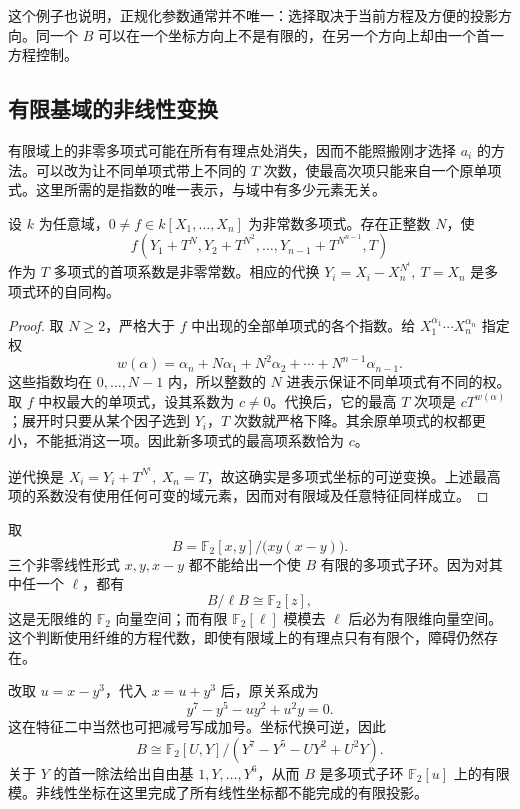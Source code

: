 这个例子也说明，正规化参数通常并不唯一：选择取决于当前方程及方便的投影方向。同一个 \(B\) 可以在一个坐标方向上不是有限的，在另一个方向上却由一个首一方程控制。

\subsection{有限基域的非线性变换}
\label{g5:subsec:0302:03}

有限域上的非零多项式可能在所有有理点处消失，因而不能照搬刚才选择 \(a_i\) 的方法。可以改为让不同单项式带上不同的 \(T\) 次数，使最高次项只能来自一个原单项式。这里所需的是指数的唯一表示，与域中有多少元素无关。

\begin{lemma}\label{g5:lem:weighted-monic-change}
	设 \(k\) 为任意域，\(0\ne f\in k[X_1,\ldots,X_n]\) 为非常数多项式。存在正整数 \(N\)，使
	\[
	f(Y_1+T^N,Y_2+T^{N^2},\ldots,Y_{n-1}+T^{N^{n-1}},T)
	\]
	作为 \(T\) 多项式的首项系数是非零常数。相应的代换
	\(Y_i=X_i-X_n^{N^i},\ T=X_n\)
	是多项式环的自同构。
\end{lemma}
\begin{proof}
	取 \(N\geq2\)，严格大于 \(f\) 中出现的全部单项式的各个指数。给
	\(X_1^{\alpha_1}\cdots X_n^{\alpha_n}\)
	指定权
	\[
	w(\alpha)=\alpha_n+N\alpha_1+N^2\alpha_2+\cdots+N^{n-1}\alpha_{n-1}.
	\]
	这些指数均在 \(0,\ldots,N-1\) 内，所以整数的 \(N\) 进表示保证不同单项式有不同的权。取 \(f\) 中权最大的单项式，设其系数为 \(c\ne0\)。代换后，它的最高 \(T\) 次项是 \(cT^{w(\alpha)}\)；展开时只要从某个因子选到 \(Y_i\)，\(T\) 次数就严格下降。其余原单项式的权都更小，不能抵消这一项。因此新多项式的最高项系数恰为 \(c\)。

	逆代换是 \(X_i=Y_i+T^{N^i},\ X_n=T\)，故这确实是多项式坐标的可逆变换。上述最高项的系数没有使用任何可变的域元素，因而对有限域及任意特征同样成立。
\end{proof}

\begin{example}\label{g5:exm:finite-field-nonlinear-normalization}
	取
	\[
	B=\mathbb F_2[x,y]/\bigl(xy(x-y)\bigr).
	\]
	三个非零线性形式 \(x,y,x-y\) 都不能给出一个使 \(B\) 有限的多项式子环。因为对其中任一个 \(\ell\)，都有
	\[
	B/\ell B\cong\mathbb F_2[z],
	\]
	这是无限维的 \(\mathbb F_2\) 向量空间；而有限 \(\mathbb F_2[\ell]\) 模模去 \(\ell\) 后必为有限维向量空间。这个判断使用纤维的方程代数，即使有限域上的有理点只有有限个，障碍仍然存在。

	改取 \(u=x-y^3\)，代入 \(x=u+y^3\) 后，原关系成为
	\[
	y^7-y^5-uy^2+u^2y=0.
	\]
	这在特征二中当然也可把减号写成加号。坐标代换可逆，因此
	\[
	B\cong
	\mathbb F_2[U,Y]/(Y^7-Y^5-UY^2+U^2Y).
	\]
	关于 \(Y\) 的首一除法给出自由基 \(1,Y,\ldots,Y^6\)，从而 \(B\) 是多项式子环 \(\mathbb F_2[u]\) 上的有限模。非线性坐标在这里完成了所有线性坐标都不能完成的有限投影。
\end{example}


